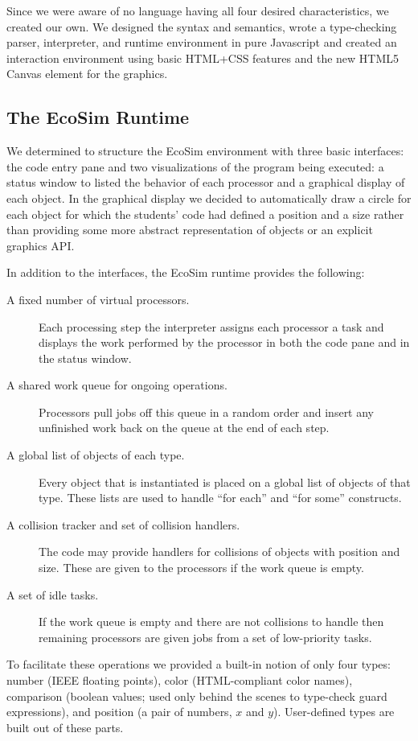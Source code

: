 \documentclass{sig-alternate}
\newcommand{\EcoSim}{EcoSim}
\begin{document}
Since we were aware of no language having all four desired characteristics, 
we created our own.
We designed the syntax and semantics, 
wrote a type-checking parser, interpreter, and runtime environment in pure Javascript
and created an interaction environment using basic HTML+CSS features 
and the new HTML5 Canvas element for the graphics.

\subsection{The \EcoSim{} Runtime}\label{sec:runtime}
We determined to structure the \EcoSim{} environment with three basic interfaces:
the code entry pane and two visualizations of the program being executed:
a status window to listed the behavior of each processor
and a graphical display of each object.
In the graphical display we decided to automatically draw a circle for each object
for which the students' code had defined a position and a size
rather than providing some more abstract representation of objects
or an explicit graphics API.

In addition to the interfaces, the \EcoSim{} runtime provides the following:
\begin{description}
	\item[A fixed number of virtual processors.]
		Each processing step the interpreter assigns each processor a task
		and displays the work performed by the processor 
		in both the code pane and in the status window.
	\item[A shared work queue for ongoing operations.]
		Processors pull jobs off this queue in a random order
		and insert any unfinished work back on the queue at the end of each step.
	\item[A global list of objects of each type.]
		Every object that is instantiated is placed on a global list of objects of that type.
		These lists are used to handle ``for each'' and ``for some'' constructs.
	\item[A collision tracker and set of collision handlers.]
		The code may provide handlers for collisions of objects with position and size.
		These are given to the processors if the work queue is empty.
	\item[A set of idle tasks.]
		If the work queue is empty and there are not collisions to handle
		then remaining processors are given jobs from a set of low-priority tasks.
\end{description}
To facilitate these operations
we provided a built-in notion of only four types:
number (IEEE floating points), color (HTML-compliant color names), 
comparison (boolean values; used only behind the scenes to type-check guard expressions),
and position (a pair of numbers, $x$ and $y$).
User-defined types are built out of these parts.
\end{document}

